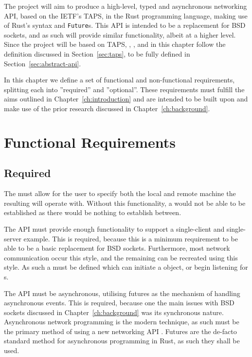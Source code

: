 The project will aim to produce a high-level, typed and asynchronous networking API, based on the IETF's TAPS, in the
Rust programming language, making use of Rust's \asyncawait syntax and \texttt{Future}s.
This API is intended to be a replacement for BSD sockets, and as such will provide similar functionality, albeit at a
higher level.
Since the project will be based on TAPS, \preconnection{}, \framer{}, \listener{} and \connection{} in this chapter
follow the definition discussed in Section~\ref{sec:taps}, to be fully defined in Section~\ref{sec:abstract-api}.

In this chapter we define a set of functional and non-functional requirements, splitting each into ''required'' and
''optional''.
These requirements must fulfill the aims outlined in Chapter~\ref{ch:introduction} and are intended to be built upon and
make use of the prior research discussed in Chapter~\ref{ch:background}.

\section{Functional Requirements}\label{sec:functional-requirements}

\subsection{Required}\label{subsec:required}
The \preconnection{} must allow for the user to specify both the local and remote machine the resulting \connection{}
will operate with.
Without this functionality, a \connection{} would not be able to be established as there would be nothing to establish
between.

The API must provide enough functionality to support a single-client and single-server example.
This is required, because this is a minimum requirement to be able to be a basic replacement for BSD sockets.
Furthermore, most network communication occur this style, and the remaining can be recreated using this style.
As such a \preconnection{} must be defined which can initiate a \connection{} object, or begin listening for
\connection{}s.

The API must be asynchronous, utilising futures as the mechanism of handling asynchronous events.
This is required, because one the main issues with BSD sockets discussed in Chapter~\ref{ch:background} was its
synchronous nature.
Asynchronous network programming is the modern technique, as such must be the primary method of using a new networking
API .
Futures are the de-facto standard method for asynchronous programming in Rust, as such they shall be used.


